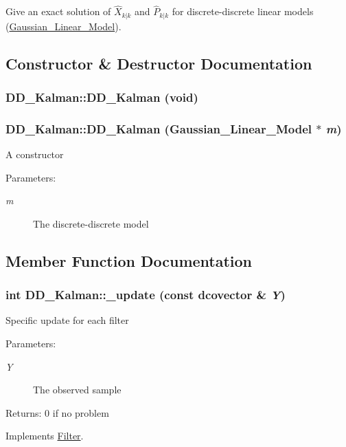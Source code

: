 Give an exact solution of $ \hat{X}_{k|k}$ and $ \hat{P}_{k|k} $ for discrete-discrete linear models (\hyperlink{class_gaussian___linear___model}{Gaussian\_\-Linear\_\-Model}). 

\subsection{Constructor \& Destructor Documentation}
\hypertarget{class_d_d___kalman_6609717ac09c6a85dfbd1417b736a54c}{
\subsubsection[{DD\_\-Kalman}]{\setlength{\rightskip}{0pt plus 5cm}DD\_\-Kalman::DD\_\-Kalman (void)}}
\label{class_d_d___kalman_6609717ac09c6a85dfbd1417b736a54c}


\hypertarget{class_d_d___kalman_dfc3b894cf701465b05ed9b49a53f49e}{
\subsubsection[{DD\_\-Kalman}]{\setlength{\rightskip}{0pt plus 5cm}DD\_\-Kalman::DD\_\-Kalman ({\bf Gaussian\_\-Linear\_\-Model} $\ast$ {\em m})}}
\label{class_d_d___kalman_dfc3b894cf701465b05ed9b49a53f49e}


A constructor

\begin{Desc}
\item[Parameters:]
\begin{description}
\item[{\em m}]The discrete-discrete model \end{description}
\end{Desc}


\subsection{Member Function Documentation}
\hypertarget{class_d_d___kalman_a04e9be77c495296673227860833c9fc}{
\subsubsection[{\_\-update}]{\setlength{\rightskip}{0pt plus 5cm}int DD\_\-Kalman::\_\-update (const dcovector \& {\em Y})}}
\label{class_d_d___kalman_a04e9be77c495296673227860833c9fc}


Specific update for each filter

\begin{Desc}
\item[Parameters:]
\begin{description}
\item[{\em Y}]The observed sample\end{description}
\end{Desc}
\begin{Desc}
\item[Returns:]0 if no problem \end{Desc}


Implements \hyperlink{class_filter_20ecd17fed3b8f11a76c960fe5e7144b}{Filter}.